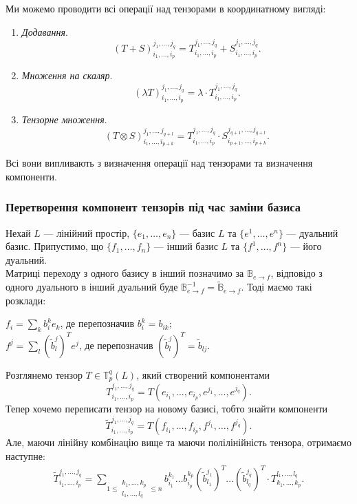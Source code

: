 \documentclass{math_library}
\begin{document}
\begin{remark}
Ми можемо проводити всі операції над тензорами в координатному вигляді:
\begin{enumerate}[nosep,wide=0pt,label={\arabic*.}]
\item \textit{Додавання}. 
\[
(T+S)_{i_1, \dots, i_p}^{j_1,\dots,j_q} = T_{i_1, \dots, i_p}^{j_1,\dots,j_q} + S_{i_1, \dots, i_p}^{j_1,\dots,j_q}.
\]
\item \textit{Множення на скаляр}. 
\[
(\lambda T)_{i_1, \dots, i_p}^{j_1,\dots,j_q} = \lambda \cdot T_{i_1, \dots, i_p}^{j_1,\dots,j_q}.
\]
\item \textit{Тензорне множення}. 
\[
(T \otimes S)_{i_1,\dots,i_{p+k}}^{j_1,\dots,j_{q+l}} = T_{i_1,\dots,i_p}^{j_1,\dots,j_q} \cdot S_{i_{p+1},\dots,i_{p+k}}^{j_{q+1},\dots,j_{q+l}}.
\]
\end{enumerate}
Всі вони випливають з визначення операції над тензорами та визначення компоненти.
\end{remark}

\subsubsection*{Перетворення компонент тензорів під час заміни базиса}
Нехай $L$ --- лінійний простір, $\{e_1,\dots,e_n\}$ --- базис $L$ та $\{e^1,\dots,e^n\}$ --- дуальний базис. Припустимо, що $\{f_1,\dots,f_n\}$ --- інший базис $L$ та $\{f^1,\dots,f^n\}$ --- його дуальний.\\
Матриці переходу з одного базису в інший позначимо за $\mathbb{B}_{e \to f}$, відповідо з одного дуального в інший дуальний буде $\mathbb{B}^{-1}_{e \to f} = \tilde{\mathbb{B}}_{e \to f}$. Тоді маємо такі розклади:
\begin{center}
$f_i = \displaystyle\sum_k b_i^k e_k$, де перепозначив $b_i^k = b_{ik}$;\\
$f^j = \displaystyle\sum_l (\tilde{b}^j_l)^T e^j$, де перепозначив $(\tilde{b}^j_l)^T = \tilde{b}_{lj}$.
\end{center}
Розглянемо тензор $T \in \mathbb{T}_p^q(L)$, який створений компонентами 
\[
T_{i_1,\dots,i_p}^{j_1,\dots,j_q} = T(e_{i_1},\dots,e_{i_p}, e^{j_1},\dots,e^{j_q}).
\]
Тепер хочемо переписати тензор на новому базисі, тобто знайти компоненти 
\[
\tilde{T}_{i_1,\dots,i_p}^{j_1,\dots,j_q} = T(f_{i_1},\dots,f_{i_p},f^{j_1},\dots,f^{j_q}).
\]
Але, маючи лінійну комбінацію вище та маючи полілінійність тензора, отримаємо наступне:
\begin{align*}
\tilde{T}_{i_1,\dots,i_p}^{j_1,\dots,j_q} = \displaystyle\sum_{1 \leq \substack{k_1,\dots,k_p \\ l_1,\dots,l_q} \leq n} b_{i_1}^{k_1} \dots b_{i_p}^{k_p} (\tilde{b}_{l_1}^{j_1})^T \dots (\tilde{b}_{l_q}^{j_q})^T \cdot T_{k_1,\dots,k_p}^{l_1,\dots,l_q}.
\end{align*}
\end{document}
